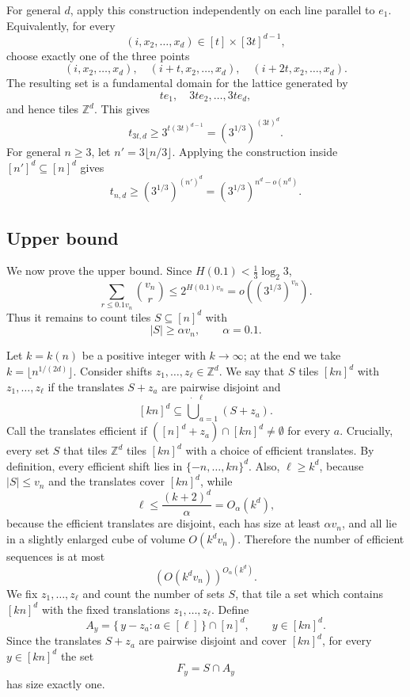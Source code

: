 \documentclass{article}
\newcommand{\Z}{\mathbb{Z}}
\begin{document}
For general \(d\), apply this construction independently on each line parallel to \(e_1\). Equivalently, for every
\[
    (i,x_2,\ldots,x_d)\in [t]\times[3t]^{d-1},
\]
choose exactly one of the three points
\[
    (i,x_2,\ldots,x_d),\quad
    (i+t,x_2,\ldots,x_d),\quad
    (i+2t,x_2,\ldots,x_d).
\]
The resulting set is a fundamental domain for the lattice generated by
\[
    t e_1,\quad 3t e_2,\ldots,3t e_d,
\]
and hence tiles \(\Z^d\). This gives
\[
    t_{3t,d}\ge 3^{t(3t)^{d-1}}
    =
    (3^{1/3})^{(3t)^d}.
\]
For general \(n\ge 3\), let \(n'=3\lfloor n/3\rfloor\). Applying the construction inside
\([n']^d\subseteq[n]^d\) gives
\[
    t_{n,d}\ge (3^{1/3})^{(n')^d}
    =
    (3^{1/3})^{n^d-o(n^d)}.
\]


\subsection{Upper bound}
We now prove the upper bound. Since \(H(0.1)<\frac13\log_2 3\),
\[
    \sum_{r\le 0.1v_n}\binom{v_n}{r}
    \le 2^{H(0.1)v_n}
    =
    o\!\left((3^{1/3})^{v_n}\right).
\]
Thus it remains to count tiles \(S\subseteq[n]^d\) with
\[
    |S|\ge \alpha v_n,\qquad \alpha=0.1.
\]

Let \(k=k(n)\) be a positive integer with $k\to\infty$; at the end we take $k=\lfloor n^{1/(2d)}\rfloor$. Consider shifts $z_1,\ldots,z_\ell\in\Z^d$. We say that $S$ tiles $[kn]^d$ with $z_1,\ldots,z_\ell$ if the translates $S+z_a$ are pairwise disjoint and
\[
    [kn]^d\subseteq \dot\bigcup_{a=1}^{\ell}(S+z_a).
\]
Call the translates efficient if \(([n]^d+z_a)\cap[kn]^d\ne\emptyset\) for every \(a\). Crucially, every set $S$ that tiles $\mathbb{Z}^d$ tiles $[kn]^d$ with a choice of efficient translates. By definition, every efficient shift lies in \(\{-n,\ldots,kn\}^d\). Also, \(\ell\ge k^d\), because \(|S|\le v_n\) and the translates cover \([kn]^d\), while
\[
    \ell\le \frac{(k+2)^d}{\alpha}=O_\alpha(k^d),
\]
because the efficient translates are disjoint, each has size at least \(\alpha v_n\), and all lie in a slightly enlarged cube of volume \(O(k^d v_n)\). Therefore the number of efficient sequences is at most
\[
    (O(k^d v_n))^{O_\alpha(k^d)}.
\]
We fix $z_1,\ldots,z_{\ell}$ and count the number of sets $S$, that tile a set which contains $[kn]^d$ with the fixed translations $z_1,\ldots,z_{\ell}$. Define
\[
    A_y=\{\,y-z_a:a\in[\ell]\,\}\cap[n]^d,
    \qquad y\in[kn]^d.
\]
\noindent Since the translates \(S+z_a\) are pairwise disjoint and cover \([kn]^d\), for every \(y\in[kn]^d\) the set
\[
    F_y=S\cap A_y
\]
has size exactly one.
\end{document}
